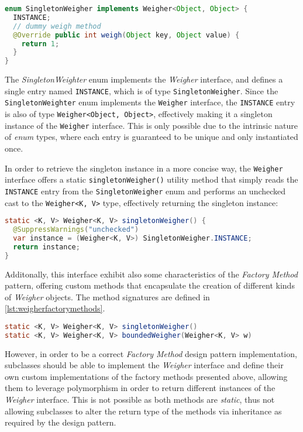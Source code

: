 \begin{lstlisting}[language=Java, caption={\texttt{SingletonWeigher} enum definition}, captionpos=b, label={lst:singletonweigher}]
enum SingletonWeigher implements Weigher<Object, Object> {
  INSTANCE;
  // dummy weigh method
  @Override public int weigh(Object key, Object value) {
    return 1;
  }
}
\end{lstlisting}

\noindent The \textit{SingletonWeighter} enum implements the \textit{Weigher} interface, and defines a single entry named \texttt{INSTANCE}, which is of type \texttt{SingletonWeigher}. Since the \texttt{SingletonWeighter} enum implements the \texttt{Weigher} interface, the \texttt{INSTANCE} entry is also of type \texttt{Weigher<Object, Object>}, effectively making it a singleton instance of the \texttt{Weigher} interface. This is only possible due to the intrinsic nature of \textit{enum} types, where each entry is guaranteed to be unique and only instantiated once.

In order to retrieve the singleton instance in a more concise way, the \texttt{Weigher} interface offers a static \texttt{singletonWeigher()} utility method that simply reads the \texttt{INSTANCE} entry from the \texttt{SingletonWeigher} enum and performs an unchecked cast to the \texttt{Weigher<K, V>} type, effectively returning the singleton instance:

\begin{lstlisting}[language=Java, caption={SingletonWeigher shorthand method to return the singleton instance using an unchecked cast}, captionpos=b, label={lst:singletonweigher}]
static <K, V> Weigher<K, V> singletonWeigher() {
  @SuppressWarnings("unchecked")
  var instance = (Weigher<K, V>) SingletonWeigher.INSTANCE;
  return instance;
}
\end{lstlisting}

\noindent Additonally, this interface exhibit also some characteristics of the \textit{Factory Method} pattern, offering custom methods that encapsulate the creation of different kinds of \textit{Weigher} objects. The method signatures are defined in \autoref{lst:weigherfactorymethods}.

\begin{lstlisting}[language=Java, caption={\texttt{Weigher} interface utility methods to create different kinds of \texttt{Weigher<K,V>}}, captionpos=b, label={lst:weigherfactorymethods}]
static <K, V> Weigher<K, V> singletonWeigher()
static <K, V> Weigher<K, V> boundedWeigher(Weigher<K, V> w)
\end{lstlisting}

\noindent However, in order to be a correct \textit{Factory Method} design pattern implementation, subclasses should be able to implement the \textit{Weigher} interface and define their own custom implementations of the factory methods presented above, allowing them to leverage polymorphism in order to return different instances of the \textit{Weigher} interface. This is not possible as both methods are \textit{static}, thus not allowing subclasses to alter the return type of the methods via inheritance as required by the design pattern.

